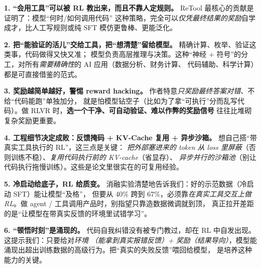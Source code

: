\documentclass[11pt,UTF8,fontset=fandol]{ctexart}
\begin{document}
\begin{takeaway}
\textbf{1. “会用工具”可以被 RL 教出来，而且不靠人定规则。} ReTool 最核心的贡献是证明了：模型“何时/如何调用代码”
这种策略，完全可以\emph{仅凭最终结果的奖励}自学成才，比人工写规则或纯 SFT 模仿更鲁棒、更能泛化。
\end{takeaway}

\begin{takeaway}
\textbf{2. 把“能验证的活儿”交给工具，把“想清楚”留给模型。} 精确计算、枚举、验证这类事，代码做得又快又准；
模型负责高层推理与决策。这种“神经 + 符号”的分工，对所有\emph{需要精确性}的 AI 应用（数据分析、财务计算、
代码辅助、科学计算）都是可直接借鉴的范式。
\end{takeaway}

\begin{takeaway}
\textbf{3. 奖励越简单越好，警惕 reward hacking。} 作者特意\emph{只奖励最终答案对错}、不给“代码能跑”单独加分，
就是怕模型钻空子（比如为了拿“可执行”分而乱写代码）。做 RLVR 时，\textbf{选一个干净、可自动验证、难以作弊的奖励信号}
往往比堆砌复杂奖励更重要。
\end{takeaway}

\begin{takeaway}
\textbf{4. 工程细节决定成败：反馈掩码 + KV-Cache 复用 + 异步沙箱。} 想自己搭“带真实工具执行的 RL”，这三点是关键：
\emph{把外部塞进来的 token 从 loss 里屏蔽}（否则训练不稳）、\emph{复用代码执行前的 KV-cache}（省显存）、
\emph{异步并行的沙箱池}（别让代码执行拖慢训练）。这些是论文里很实在的可复用经验。
\end{takeaway}

\begin{takeaway}
\textbf{5. 冷启动给底子，RL 给质变。} 消融实验清楚地告诉我们：好的示范数据（冷启动 SFT）能让模型“及格”，
但要从 40\% 跨到 67\%，必须靠\emph{在真实工具交互上做 RL}。做 agent / 工具调用产品时，别指望只靠造数据微调就到顶，
真正拉开差距的是“让模型在带真实反馈的环境里试错学习”。
\end{takeaway}

\begin{takeaway}
\textbf{6. “顿悟时刻”是涌现的。} 代码自我纠错没有被专门教过，却在 RL 中自发出现。这提示我们：只要给对\emph{环境
（能拿到真实报错反馈）+ 奖励（结果导向）}，模型能涌现出超出训练数据的高级行为。把“真实的失败反馈”喂回给模型，
是培养这种能力的关键。
\end{takeaway}

\end{document}
